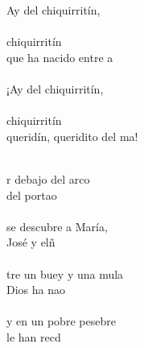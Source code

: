 \begin{cancion}[Chiquirritín][]%
	\begin{chorus}%
	Ay del chiquirritín,\\
	\jump\\
chiquirritín\\
	que ha nacido entre a\\
	\jump\\
¡Ay del chiquirritín, \\
	\jump\\
chiquirritín\\
	queridín, queridito del ma!\\
	\end{chorus}%
	\jump\\
	r debajo del arco \\
	del portao\\
	\jump\\
se descubre a María, \\
	José y elñ \\
	\jump\\
	tre un buey y una mula\\
	Dios ha nao\\
	\jump\\
y en un pobre pesebre \\
	le han recd\\
\end{cancion}%
